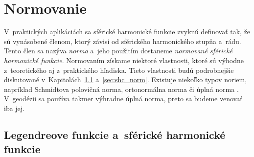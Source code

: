 \documentclass[a4paper, 12pt]{book}
\begin{document}
\section{Normovanie}
\label{sec:normalization}

V~praktických aplikáciách sa sférické harmonické funkcie zvyknú definovať tak, 
že sú vynásobené členom, ktorý závisí od sférického harmonického stupňa a~rádu.  
Tento člen sa nazýva \emph{norma} a~jeho použitím dostaneme \emph{normované 
sférické harmonické funkcie}.  Normovaním získame niektoré vlastnosti, ktoré sú 
výhodne z~teoretického aj z~praktického hľadiska.  Tieto vlastnosti budú 
podrobnejšie diskutované v~Kapitolách~\ref{sec:leg_sh_norm} 
a~\ref{sec:shc_norm}.  Existuje niekoľko typov noriem, napríklad Schmidtova 
polovičná norma, ortonormálna norma či úplná norma \parencite{SHTOOLS}.  
V~geodézii sa používa takmer výhradne úplná norma, preto sa budeme venovať iba 
jej.

\subsection{Legendreove funkcie a~sférické harmonické funkcie}
\label{sec:leg_sh_norm}
\end{document}
